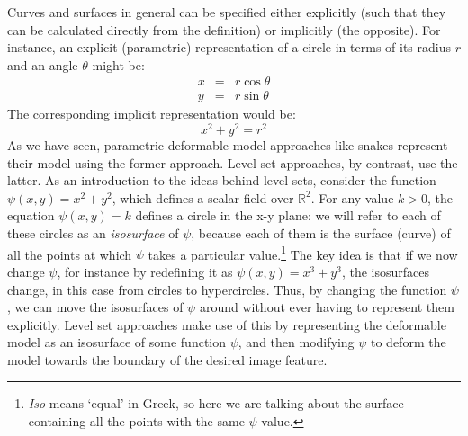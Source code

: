 Curves and surfaces in general can be specified either explicitly (such that they can be calculated directly from the definition) or implicitly (the opposite). For instance, an explicit (parametric) representation of a circle in terms of its radius $r$ and an angle $\theta$ might be:
%
\begin{eqnarray*}
x & = & r \cos \theta \\
y & = & r \sin \theta
\end{eqnarray*}
%
The corresponding implicit representation would be:
%
\[
x^2 + y^2 = r^2
\]
%
As we have seen, parametric deformable model approaches like snakes represent their model using the former approach. Level set approaches, by contrast, use the latter. As an introduction to the ideas behind level sets, consider the function $\psi(x,y) = x^2 + y^2$, which defines a scalar field over $\mathbb{R}^2$. For any value $k > 0$, the equation $\psi(x,y) = k$ defines a circle in the x-y plane: we will refer to each of these circles as an \emph{isosurface} of $\psi$, because each of them is the surface (curve) of all the points at which $\psi$ takes a particular value.\footnote{\emph{Iso} means `equal' in Greek, so here we are talking about the surface containing all the points with the same $\psi$ value.} The key idea is that if we now change $\psi$, for instance by redefining it as $\psi(x,y) = x^3 + y^3$, the isosurfaces change, in this case from circles to hypercircles. Thus, by changing the function $\psi$, we can move the isosurfaces of $\psi$ around without ever having to represent them explicitly. Level set approaches make use of this by representing the deformable model as an isosurface of some function $\psi$, and then modifying $\psi$ to deform the model towards the boundary of the desired image feature.




